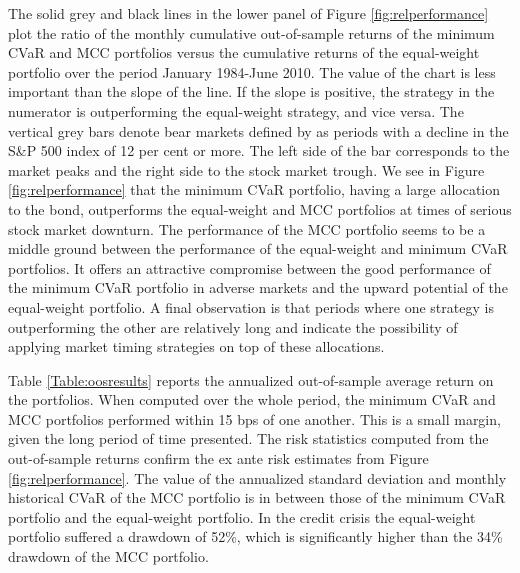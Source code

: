 \documentclass[12pt,a4paper]{article}
\begin{document}
The solid grey and black lines in the lower panel of Figure \ref{fig:relperformance} plot the ratio of the monthly cumulative out-of-sample returns of the minimum CVaR and MCC portfolios versus the cumulative returns of the equal-weight portfolio over the period January 1984-June 2010. The value of the chart is less important than the slope of the line. If the slope is positive, the strategy in the numerator is outperforming the equal-weight strategy, and vice versa. The vertical grey bars denote bear markets defined by \citet{Ellis2005} as periods with a decline in the S\&P 500 index of 12 per cent or more. The left side of the bar corresponds to the market peaks and the right side to the stock market trough.  We see in Figure \ref{fig:relperformance} that the minimum CVaR portfolio, having a large allocation to the bond, outperforms the equal-weight and MCC portfolios at times of serious stock market downturn. The performance of the MCC portfolio seems to be a middle ground between the performance of the equal-weight and minimum CVaR portfolios. It offers an attractive compromise between the good performance of the minimum CVaR portfolio in adverse markets and the upward potential of the equal-weight portfolio. A final observation is that periods where one strategy is outperforming the other are relatively long and indicate the possibility of applying market timing strategies on top of these allocations.

Table \ref{Table:oosresults} reports the annualized out-of-sample average return on the portfolios. When computed over the whole period, the minimum CVaR and MCC portfolios performed within 15 bps of one another. This is a small margin, given the long period of time presented. The risk statistics computed from the out-of-sample returns confirm the ex ante risk estimates from Figure \ref{fig:relperformance}.  The value of the annualized standard deviation and monthly historical CVaR of the MCC portfolio is in between those of the minimum CVaR portfolio and the equal-weight portfolio.    In the credit crisis the equal-weight portfolio suffered a drawdown of 52\%, which is significantly higher than the 34\%  drawdown of the MCC portfolio.
\end{document}
